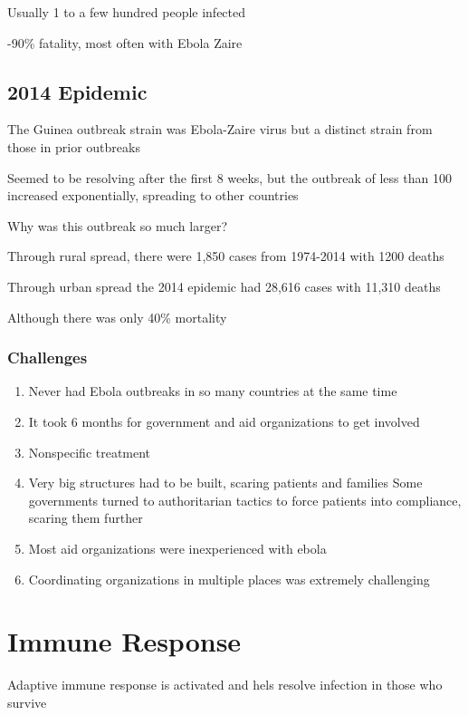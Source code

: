 \documentclass{notes}
\begin{document}
\tab Usually 1 to a few hundred people infected

-90\% fatality, most often with Ebola Zaire

\subsection{2014 Epidemic}

The Guinea outbreak strain was Ebola-Zaire virus but a distinct strain from those in prior outbreaks

Seemed to be resolving after the first 8 weeks, but the outbreak of less than 100 increased exponentially, spreading to other countries

Why was this outbreak so much larger?

Through rural spread, there were 1,850 cases from 1974-2014 with 1200 deaths

Through urban spread the 2014 epidemic had 28,616 cases with 11,310 deaths

\tab Although there was only 40\% mortality

\subsubsection{Challenges}

\begin{enumerate}
    \item Never had Ebola outbreaks in so many countries at the same time
    \item It took 6 months for government and aid organizations to get involved
    \item Nonspecific treatment
    \item Very big structures had to be built, scaring patients and families
    \subitem Some governments turned to authoritarian tactics to force patients into compliance, scaring them further
    \item Most aid organizations were inexperienced with ebola
    \item Coordinating organizations in multiple places was extremely challenging
\end{enumerate}

\section{Immune Response}

Adaptive immune response is activated and hels resolve infection in those who survive
\end{document}
